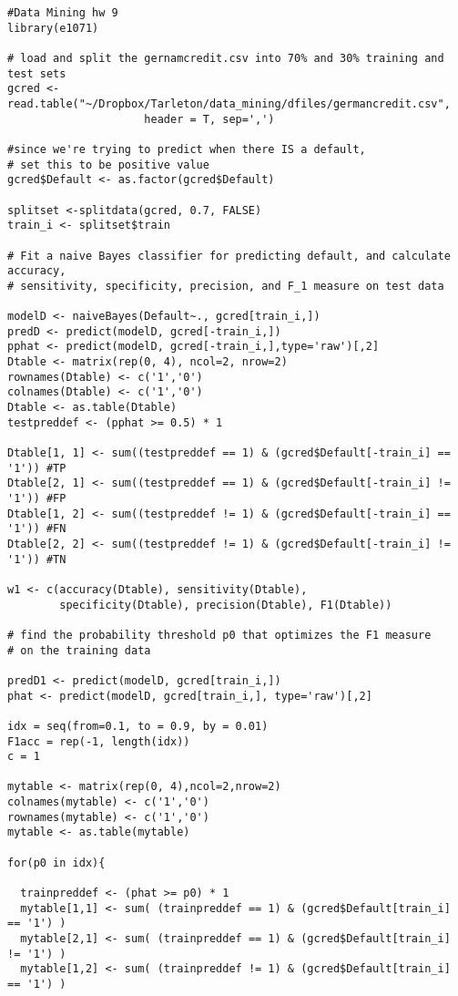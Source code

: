 \documentclass[11pt]{article}
\begin{document}
\newpage
\begin{Verbatim}
#Data Mining hw 9
library(e1071)

# load and split the gernamcredit.csv into 70% and 30% training and test sets
gcred <- read.table("~/Dropbox/Tarleton/data_mining/dfiles/germancredit.csv", 
                     header = T, sep=',')

#since we're trying to predict when there IS a default, 
# set this to be positive value
gcred$Default <- as.factor(gcred$Default)

splitset <-splitdata(gcred, 0.7, FALSE)
train_i <- splitset$train

# Fit a naive Bayes classifier for predicting default, and calculate accuracy, 
# sensitivity, specificity, precision, and F_1 measure on test data

modelD <- naiveBayes(Default~., gcred[train_i,])
predD <- predict(modelD, gcred[-train_i,])
pphat <- predict(modelD, gcred[-train_i,],type='raw')[,2]
Dtable <- matrix(rep(0, 4), ncol=2, nrow=2)
rownames(Dtable) <- c('1','0')
colnames(Dtable) <- c('1','0')
Dtable <- as.table(Dtable)
testpreddef <- (pphat >= 0.5) * 1

Dtable[1, 1] <- sum((testpreddef == 1) & (gcred$Default[-train_i] == '1')) #TP
Dtable[2, 1] <- sum((testpreddef == 1) & (gcred$Default[-train_i] != '1')) #FP
Dtable[1, 2] <- sum((testpreddef != 1) & (gcred$Default[-train_i] == '1')) #FN
Dtable[2, 2] <- sum((testpreddef != 1) & (gcred$Default[-train_i] != '1')) #TN

w1 <- c(accuracy(Dtable), sensitivity(Dtable), 
        specificity(Dtable), precision(Dtable), F1(Dtable))

# find the probability threshold p0 that optimizes the F1 measure 
# on the training data

predD1 <- predict(modelD, gcred[train_i,])
phat <- predict(modelD, gcred[train_i,], type='raw')[,2]

idx = seq(from=0.1, to = 0.9, by = 0.01)
F1acc = rep(-1, length(idx))
c = 1

mytable <- matrix(rep(0, 4),ncol=2,nrow=2)
colnames(mytable) <- c('1','0')
rownames(mytable) <- c('1','0')
mytable <- as.table(mytable)

for(p0 in idx){

  trainpreddef <- (phat >= p0) * 1
  mytable[1,1] <- sum( (trainpreddef == 1) & (gcred$Default[train_i] == '1') )
  mytable[2,1] <- sum( (trainpreddef == 1) & (gcred$Default[train_i] != '1') )
  mytable[1,2] <- sum( (trainpreddef != 1) & (gcred$Default[train_i] == '1') )


\end{Verbatim}
\end{document}
